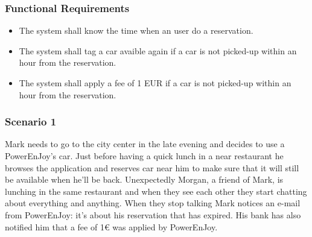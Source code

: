 \subsubsection{Functional Requirements}
\begin{itemize}
  \item The system shall know the time when an user do a reservation.
  \item The system shall tag a car avaible again if a car is not picked-up within an hour from the reservation.
  \item The system shall apply a fee of 1 EUR if a car is not picked-up within an hour from the reservation.
\end{itemize}

\subsubsection{Scenario 1}
Mark needs to go to the city center in the late evening and decides to use a PowerEnJoy's car. Just before having a quick lunch in a near restaurant he browses the application and reserves car near him to make sure that it will still be available when he'll be back.
Unexpectedly Morgan, a friend of Mark, is lunching in the same restaurant and when they see each other they start chatting about everything and anything. When they stop talking Mark notices an e-mail from PowerEnJoy: it's about his reservation that has expired. His bank has also notified him that a fee of 1€ was applied by PowerEnJoy.



